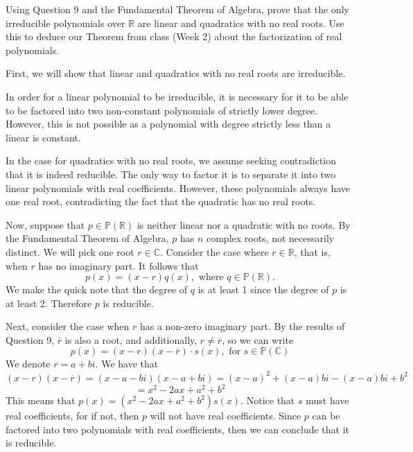 \documentclass{article}
\theoremstyle{plain} %
\numberwithin{thm}{section} %
\theoremstyle{definition}
\begin{document}
    \begin{question}{10}
        Using Question 9 and the Fundamental Theorem of Algebra, prove that the only irreducible 
        polynomials over $\mathbb{R}$ are linear and quadratics with no real roots. Use this to deduce our Theorem from class (Week 2) about the factorization of real polynomials.

        \tcblower

        First, we will show that linear and quadratics with no real roots are irreducible.

        In order for a linear polynomial to be irreducible, it is necessary for it to be able to be factored into two non-constant polynomials of strictly lower degree. However, this is not possible as a polynomial with degree strictly less than a linear is constant.

        In the case for quadratics with no real roots, we assume seeking contradiction that it is indeed reducible. The only way to factor it is to separate it into two linear polynomials with real coefficients. However, these polynomials always have one real root, contradicting the fact that the quadratic has no real roots.

        Now, suppose that \(p \in \mathbb{P}(\mathbb{R})\) is neither linear nor a quadratic with no roots. By the Fundamental Theorem of Algebra, \(p\) has \(n\) complex roots, not necessarily distinct. We will pick one root \(r \in \mathbb{C}\). Consider the case where \(r \in \mathbb{R}\), that is, when \(r\) has no imaginary part. It follows that
        \[
            p(x) = (x - r)q(x), \text{ where } q \in \mathbb{P} (\mathbb{R}).
        \]
        We make the quick note that the degree of \(q\) is at least 1 since the degree of \(p\) is at least 2. Therefore \(p\) is reducible.
        
        Next, consider the case when \(r\) has a non-zero imaginary part. By the results of Question 9, \(\overline{r}\) is also a root, and additionally, \(r \neq \overline{r}\), so we can write
        \[
            p(x) = (x - r)(x - \overline{r})\cdot s(x), \text{ for } s \in \mathbb{P}(\mathbb{C})
        \]
        We denote \(r = a + bi\). We have that
        \[
            (x - r)(x - \overline{r}) = (x - a - bi)(x - a + bi) = (x - a)^2 + (x - a)bi - (x - a)bi + b^2
        \]
        \[
            = x^2 - 2ax + a^2 + b^2 
        \]
        This means that \(p(x) = (x^2 - 2ax + a^2 + b^2)s(x)\). Notice that \(s\) must have real coefficients, for if not, then \(p\) will not have real coefficients. Since \(p\) can be factored into two polynomials with real coefficients, then we can conclude that it is reducible.
    \end{question}
\end{document}
